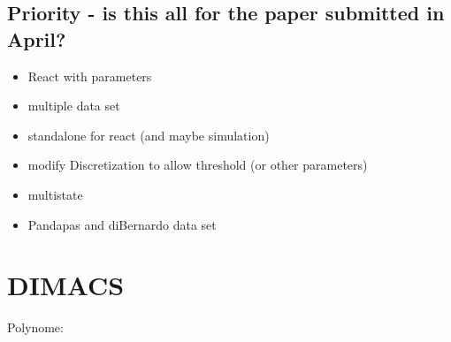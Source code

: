 \documentclass[10pt]{article}
\begin{document}
\subsection*{Priority - is this all for the paper submitted in April?}
\begin{itemize}
	\item React with parameters
	\item multiple data set
	\item standalone for react (and maybe simulation)
	\item modify Discretization to allow threshold (or other parameters)
    \item multistate
    \item Pandapas and diBernardo data set
\end{itemize}
\section*{DIMACS}
Polynome: 
\end{document}

